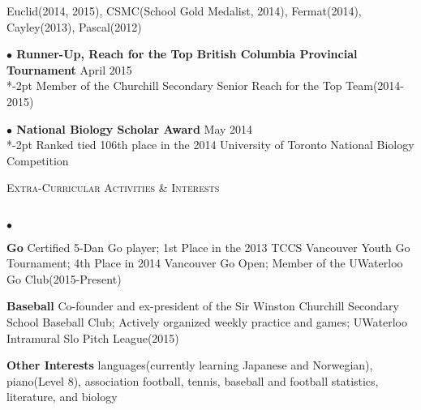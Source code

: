 \documentclass{article}
\newcommand{\lineunder}{\vspace*{-8pt} \\ \hspace*{-18pt} \hrulefill \\}
\newcommand{\header}[1]{{\hspace*{-15pt}\vspace*{6pt} \textsc{#1}} \vspace*{-6pt} \lineunder}
\newenvironment{achievements}{\begin{list}{$\bullet$}{\topsep 0pt \itemsep -2pt}}{\vspace*{4pt}\end{list}}
\newcommand{\award}[3]{\textbf{$\bullet$ \hspace{2bp}#1} \hfill{#2} \\ \vspace{2pt}
}
\begin{document}
\vspace{-2pt}
\hspace{8bp}
Euclid(2014, 2015), CSMC(School Gold Medalist, 2014), Fermat(2014), Cayley(2013), Pascal(2012)

\award{Runner-Up, Reach for the Top British Columbia Provincial Tournament}{April 2015}

\vspace*{-2pt}
\hspace{8bp}
Member of the Churchill Secondary Senior Reach for the Top Team(2014-2015)

\award{National Biology Scholar Award}{May 2014}

\vspace*{-2pt}
\hspace{8bp}
Ranked tied 106th place in the 2014 University of Toronto National Biology Competition

\vspace*{5pt}

\header{Extra-Curricular Activities \& Interests}
\begin{achievements}
\item \textbf{Go} \hspace{3bp}Certified 5-Dan Go player; 1st Place in the 2013 TCCS Vancouver Youth Go Tournament; 4th Place in 2014 Vancouver Go Open; Member of the UWaterloo Go Club(2015-Present)
\item \textbf{Baseball}	\hspace{3bp}Co-founder and ex-president of the Sir Winston Churchill Secondary School Baseball Club; Actively organized weekly practice and games; UWaterloo Intramural Slo Pitch League(2015)
\item \textbf{Other Interests} \hspace{3bp}languages(currently learning Japanese and Norwegian), piano(Level 8), association football, tennis, baseball and football statistics, literature, and biology
\end{achievements}
\end{document}
